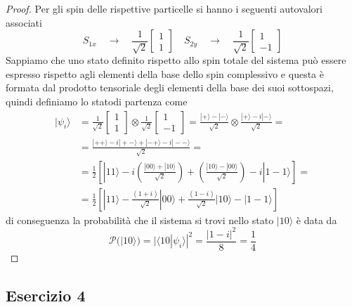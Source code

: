 \begin{proof}
	Per gli spin delle rispettive particelle si hanno i seguenti autovalori associati
	\begin{equation*}
		S_{1x} \quad \to \quad \frac{1}{\sqrt{2}}\left[\begin{array}{l}
			1 \\ 1
		\end{array}\right] \quad S_{2y} \quad \to \quad \frac{1}{\sqrt{2}}\left[\begin{array}{l}
			1 \\ -1
		\end{array}\right] 
	\end{equation*}
Sappiamo che uno stato definito rispetto allo spin totale del sistema pu\`o essere espresso rispetto agli elementi della base dello spin complessivo e questa \`e formata dal prodotto tensoriale degli elementi della base dei suoi sottospazi, quindi definiamo lo statodi partenza come
\begin{align*}
	|\psi_i \rangle & = \frac{1}{\sqrt{2}}\left[\begin{array}{l}
			1 \\ 1
		\end{array}\right] \otimes \frac{1}{\sqrt{2}}\left[\begin{array}{l}
			1 \\ -1
		\end{array}\right]  = \frac{|+\rangle - | - \rangle}{\sqrt{2}} \otimes \frac{|+ \rangle - i|-\rangle }{\sqrt{2}} = \\[0.5cm]
		& = \frac{|++\rangle - i |+-\rangle +|-+ \rangle -i |--\rangle}{\sqrt{2}} = \\[0.5cm]
		& = \frac{1}{2} \left[|11 \rangle -i\left(\frac{|00\rangle +|10 \rangle}{\sqrt{2}}\right) + \left(\frac{|10 \rangle -|00 \rangle }{\sqrt{2}}\right)-i|1-1\rangle \right] = \\[0.5cm]
		& = \frac{1}{2} \left[|11 \rangle -\frac{(1+i)}{\sqrt{2}}|00\rangle + \frac{(1-i)}{\sqrt{2}}|10\rangle - |1-1\rangle   \right]
\end{align*}	
di conseguenza la probabilit\`a che il sistema si trovi nello stato $|10\rangle $ \`e data da
\begin{equation*}
	\mathcal{P}(|10\rangle) = |\langle 10|\psi_i \rangle|^2 = \frac{|1-i|^2}{8} = \frac{1}{4}
\end{equation*}
\end{proof}

\newpage

\subsection{Esercizio 4}

